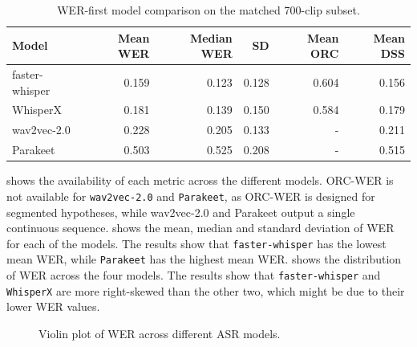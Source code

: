 \begin{table}[ht]
\centering
\caption{WER-first model comparison on the matched 700-clip subset.}
\label{tab:cross_model_wer_first}
\begin{tabular}{lrrrrr}
\toprule
\textbf{Model} & \textbf{Mean WER} & \textbf{Median WER} & \textbf{SD}  & \textbf{Mean ORC} & \textbf{Mean DSS}\\
\midrule
faster-whisper  & 0.159 & 0.123 & 0.128 & 0.604 & 0.156 \\
WhisperX  & 0.181 & 0.139 & 0.150 & 0.584 & 0.179\\
wav2vec-2.0 & 0.228 & 0.205 & 0.133 & - & 0.211\\
Parakeet  & 0.503 & 0.525 & 0.208  & - & 0.515\\
\bottomrule
\end{tabular}
\end{table}



 shows the availability of each metric across the different models. ORC-WER is not available for \texttt{wav2vec-2.0} and \texttt{Parakeet}, as ORC-WER is designed for segmented hypotheses, while wav2vec-2.0 and Parakeet output a single continuous sequence.  shows the mean, median and standard deviation of WER for each of the models. The results show that \texttt{faster-whisper} has the lowest mean WER, while \texttt{Parakeet} has the highest mean WER.  shows the distribution of WER across the four models. The results show that \texttt{faster-whisper} and \texttt{WhisperX} are more right-skewed than the other two, which might be due to their lower WER values.


\begin{figure}[htbp]
    \centering
    \caption{Violin plot of WER across different ASR models.}
    \label{fig:stat_cross_model_wer_box}
\end{figure}



